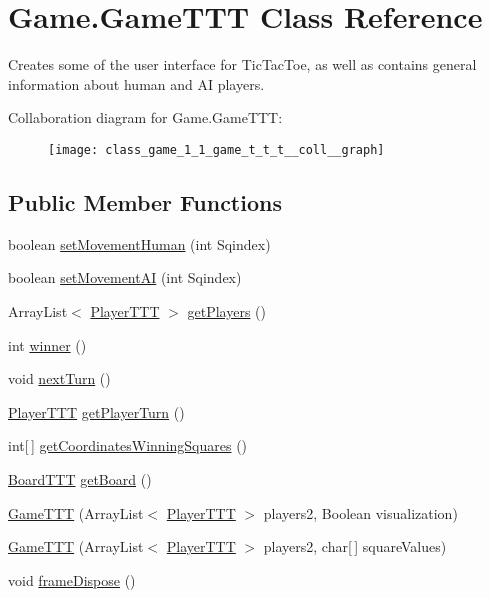 \hypertarget{class_game_1_1_game_t_t_t}{}\section{Game.\+Game\+T\+T\+T Class Reference}
\label{class_game_1_1_game_t_t_t}


Creates some of the user interface for Tic\+Tac\+Toe, as well as contains general information about human and A\+I players.  




Collaboration diagram for Game.\+Game\+T\+T\+T\+:\nopagebreak
\begin{figure}[H]
\begin{center}
\leavevmode
\texttt{[image: class\_game\_1\_1\_game\_t\_t\_t\_\_coll\_\_graph]}
\end{center}
\end{figure}
\subsection*{Public Member Functions}
\begin{DoxyCompactItemize}
\item 
boolean \hyperlink{class_game_1_1_game_t_t_t_a0791200e84a23a5dc121df19e6b6d308}{set\+Movement\+Human} (int Sqindex)
\item 
boolean \hyperlink{class_game_1_1_game_t_t_t_a85cffeaf994f8a35e3c56282b641a7a6}{set\+Movement\+A\+I} (int Sqindex)
\item 
Array\+List$<$ \hyperlink{class_player_1_1_player_t_t_t}{Player\+T\+T\+T} $>$ \hyperlink{class_game_1_1_game_t_t_t_a079a7a4f3c45ad5613a5765494c45d07}{get\+Players} ()
\item 
int \hyperlink{class_game_1_1_game_t_t_t_ac1f85bc3a5fc38f6ce84d53f36591ccd}{winner} ()
\item 
void \hyperlink{class_game_1_1_game_t_t_t_a8cbcf85e799d76e5c1b17dc54a3bc113}{next\+Turn} ()
\item 
\hyperlink{class_player_1_1_player_t_t_t}{Player\+T\+T\+T} \hyperlink{class_game_1_1_game_t_t_t_a751517c76715c85be2ff6b22ea1dbfe4}{get\+Player\+Turn} ()
\item 
int\mbox{[}$\,$\mbox{]} \hyperlink{class_game_1_1_game_t_t_t_a73acd5e17507d3c5aaca626202c61b1b}{get\+Coordinates\+Winning\+Squares} ()
\item 
\hyperlink{class_board_1_1_board_t_t_t}{Board\+T\+T\+T} \hyperlink{class_game_1_1_game_t_t_t_a2bc6494f74d04c47d2b294be71ee083f}{get\+Board} ()
\item 
\hyperlink{class_game_1_1_game_t_t_t_a730d7c27a82de9c4c5125b7fd8466ff2}{Game\+T\+T\+T} (Array\+List$<$ \hyperlink{class_player_1_1_player_t_t_t}{Player\+T\+T\+T} $>$ players2, Boolean visualization)
\item 
\hyperlink{class_game_1_1_game_t_t_t_adadd26eb4181169333b929dace529d2b}{Game\+T\+T\+T} (Array\+List$<$ \hyperlink{class_player_1_1_player_t_t_t}{Player\+T\+T\+T} $>$ players2, char\mbox{[}$\,$\mbox{]} square\+Values)
\item 
void \hyperlink{class_game_1_1_game_t_t_t_aa34199a3a29bba81669f56a08703d451}{frame\+Dispose} ()
\end{DoxyCompactItemize}
